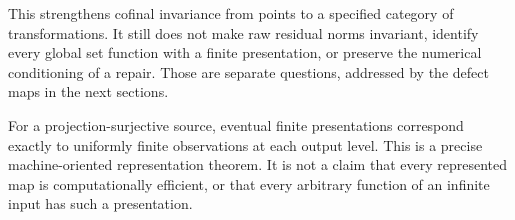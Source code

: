 This strengthens cofinal invariance from points to a specified category of transformations. It still does not make raw residual norms invariant, identify every global set function with a finite presentation, or preserve the numerical conditioning of a repair. Those are separate questions, addressed by the defect maps in the next sections.

\begin{insight}
For a projection-surjective source, eventual finite presentations correspond exactly to uniformly finite observations at each output level. This is a precise machine-oriented representation theorem. It is not a claim that every represented map is computationally efficient, or that every arbitrary function of an infinite input has such a presentation.
\end{insight}
